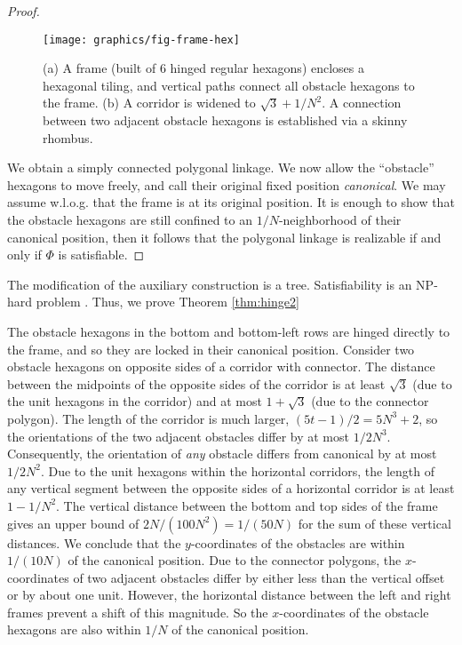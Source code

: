 \begin{proof}
\begin{figure}[htbp]
	\centering
	\texttt{[image: graphics/fig-frame-hex]}
	\caption{(a) A frame (built of 6 hinged regular hexagons) encloses a hexagonal tiling, and
    vertical paths connect all obstacle hexagons to the frame.
    (b) A corridor is widened to $\sqrt{3}+1/N^2$. A connection between
    two adjacent obstacle hexagons is established via a skinny rhombus.}
	\label{fig:frame}
\end{figure}

We obtain a simply connected polygonal linkage. We now allow the ``obstacle'' hexagons
to move freely, and call their original fixed position \emph{canonical}. We may assume
w.l.o.g. that the frame is at its original position. It is enough to show that the obstacle
hexagons are still confined to an $1/N$-neighborhood of their canonical position, then it
follows that the polygonal linkage is realizable if and only if $\Phi$ is satisfiable.
\end{proof}
The modification of the auxiliary construction is a tree.  
Satisfiability is an NP-hard problem \cite{cook1971complexity}.
Thus, we prove Theorem \ref{thm:hinge2}

The obstacle hexagons in the bottom and bottom-left rows are hinged directly to the frame,
and so they are locked in their canonical position. Consider two obstacle hexagons on opposite
sides of a corridor with connector. The distance between the midpoints of the opposite sides of
the corridor is at least $\sqrt{3}$ (due to the unit hexagons in the corridor) and at most
$1+\sqrt{3}$ (due to the connector polygon). The length of the corridor is much larger,
$(5t-1)/2=5N^3+2$, so the orientations of the two adjacent obstacles differ by at most $1/2N^3$.
Consequently, the orientation of \emph{any} obstacle differs from canonical by at most $1/2N^2$.
Due to the unit hexagons within the horizontal corridors, the length of any vertical segment between
the opposite sides of a horizontal corridor is at least $1-1/N^2$. The vertical distance between the
bottom and top sides of the frame gives an upper bound of  $2N/(100N^2)=1/(50N)$ for the sum of these
vertical distances. We conclude that the $y$-coordinates of the obstacles are within $1/(10N)$
of the canonical position. Due to the connector polygons, the $x$-coordinates of
two adjacent obstacles differ by either less than the vertical offset or by about
one unit. However, the horizontal distance between the left and right frames prevent
a shift of this magnitude. So the $x$-coordinates of the obstacle hexagons are also
within $1/N$ of the canonical position.

